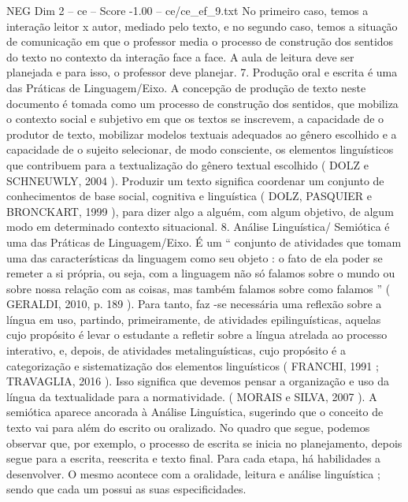 \begin{textsample}{NEG Dim 2 – ce – Score -1.00 – ce/ce\_ef\_9.txt}
No primeiro caso, temos a interação leitor x autor, mediado pelo texto, e no segundo caso, temos a situação de comunicação em que o professor media o processo de construção dos sentidos do texto no contexto da interação face a face.
A aula de leitura deve ser planejada e para isso, o professor deve planejar. 7.
Produção oral e escrita é uma das Práticas de Linguagem/Eixo.
A concepção de produção de texto neste documento é tomada como um processo de construção dos sentidos, que mobiliza o contexto social e subjetivo em que os textos se inscrevem, a capacidade de o produtor de texto, mobilizar modelos textuais adequados ao gênero escolhido e a capacidade de o sujeito selecionar, de modo consciente, os elementos linguísticos que contribuem para a textualização do gênero textual escolhido ( DOLZ e SCHNEUWLY, 2004 ).
Produzir um texto significa coordenar um conjunto de conhecimentos de base social, cognitiva e linguística ( DOLZ, PASQUIER e BRONCKART, 1999 ), para dizer algo a alguém, com algum objetivo, de algum modo em determinado contexto situacional. 8.
Análise Linguística/ Semiótica é uma das Práticas de Linguagem/Eixo.
É um “ conjunto de atividades que tomam uma das características da linguagem como seu objeto : o fato de ela poder se remeter a si própria, ou seja, com a linguagem não só falamos sobre o mundo ou sobre nossa relação com as coisas, mas também falamos sobre como falamos ” ( GERALDI, 2010, p. 189 ).
Para tanto, faz -se necessária uma reflexão sobre a língua em uso, partindo, primeiramente, de atividades epilinguísticas, aquelas cujo propósito é levar o estudante a refletir sobre a língua atrelada ao processo interativo, e, depois, de atividades metalinguísticas, cujo propósito é a categorização e sistematização dos elementos linguísticos ( FRANCHI, 1991 ; TRAVAGLIA, 2016 ).
Isso significa que devemos pensar a organização e uso da língua da textualidade para a normatividade. ( MORAIS e SILVA, 2007 ).
A semiótica aparece ancorada à Análise Linguística, sugerindo que o conceito de texto vai para além do escrito ou oralizado.
No quadro que segue, podemos observar que, por exemplo, o processo de escrita se inicia no planejamento, depois segue para a escrita, reescrita e texto final.
Para cada etapa, há habilidades a desenvolver.
O mesmo acontece com a oralidade, leitura e análise linguística ; sendo que cada um possui as suas especificidades.

\end{textsample}
